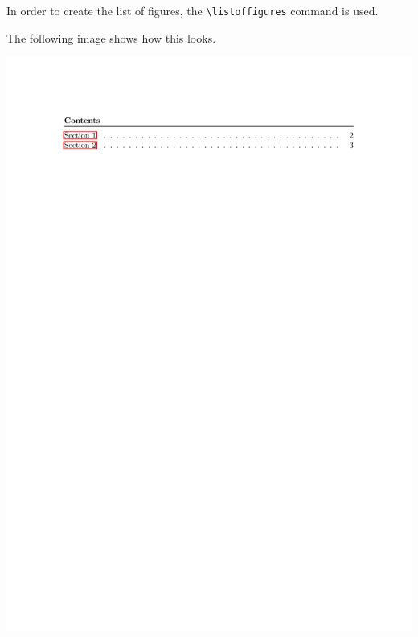 In order to create the list of figures, the \Verb|\listoffigures| command is used.

The following image shows how this looks.

\centering
\begin{myFIG}{}
	\includegraphics[page=1,scale=0.24]{examples/zz_bsp_file_TOC.pdf}
\end{myFIG}
\quad
